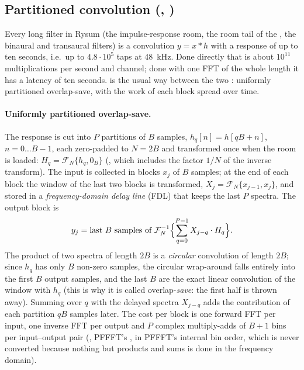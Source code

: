 \subsection{Partitioned convolution (, )}
\label{sec:math-partconv}
Every long filter in Rysum (the impulse-response room, the room tail of the , the binaural and transaural
filters) is a convolution $y = x * h$ with a response of up to ten seconds, i.e.\ up to $4.8\cdot10^5$ taps at
\SI{48}{kHz}. Done directly that is about $10^{11}$ multiplications per second and channel; done with one FFT of the
whole length it has a latency of ten seconds.  is the usual way between the two
\citep{gardner1995}: uniformly partitioned overlap-save, with the work of each block spread over time.

\paragraph{Uniformly partitioned overlap-save.} The response is cut into $P$ partitions of $B$ samples,
$h_q[n] = h[qB+n]$, $n = 0\dots B-1$, each zero-padded to $N = 2B$ and transformed once when the room is loaded:
$H_q = \mathcal F_N\{h_q, 0_B\}$ (, which includes the factor $1/N$ of the inverse
transform). The input is collected in blocks $x_j$ of $B$ samples; at the end of each block the window of the last two
blocks is transformed, $X_j = \mathcal F_N\{x_{j-1}, x_j\}$, and stored in a \emph{frequency-domain delay line} (FDL)
that keeps the last $P$ spectra. The output block is
\begin{equation}
  y_j = \text{last $B$ samples of}\ \mathcal F_N^{-1}\Bigl\{\sum_{q=0}^{P-1} X_{j-q}\cdot H_q\Bigr\}.
\end{equation}
The product of two spectra of length $2B$ is a \emph{circular} convolution of length $2B$; since $h_q$ has only $B$
non-zero samples, the circular wrap-around falls entirely into the first $B$ output samples, and the last $B$ are the
exact linear convolution of the window with $h_q$ (this is why it is called overlap-\emph{save}: the first half is
thrown away). Summing over $q$ with the delayed spectra $X_{j-q}$ adds the contribution of each partition $qB$
samples later. The cost per block is one forward FFT per input, one inverse FFT per output and $P$ complex
multiply-adds of $B+1$ bins per input--output pair (, PFFFT's 
\citep{pffft}, in PFFFT's internal bin order, which is never converted because nothing but products and sums is done
in the frequency domain).

